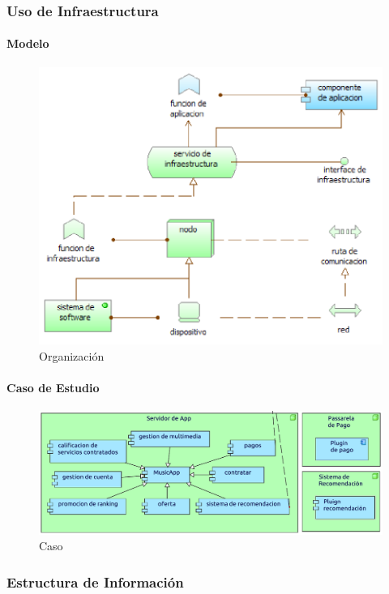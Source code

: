 \newpage

\subsubsection{Uso de Infraestructura}
\paragraph{Modelo}
\begin{figure}[h!]
	\centering
	\includegraphics[width=0.8\linewidth]{Desarrollo/ArquitecturaEmpresarial/Tecnologia/imgs/uso.PNG}
	\caption{Organización}
\end{figure}
\newpage
\paragraph{Caso de Estudio}

\begin{figure}[h!]
	\centering
	\includegraphics[width=\linewidth]{Desarrollo/ArquitecturaEmpresarial/Tecnologia/imgs/uso.pdf}
	\caption{Caso}
\end{figure}

\newpage

\subsubsection{Estructura de Información}
